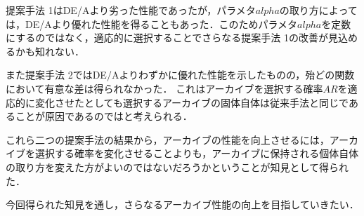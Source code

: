 \documentclass[a4paper,11pt,oneside,openany]{jsbook}
\begin{document}
提案手法 1はDE/Aより劣った性能であったが，パラメタ$alpha$の取り方によっては，DE/Aより優れた性能を得ることもあった．このためパラメタ$alpha$を定数にするのではなく，適応的に選択することでさらなる提案手法 1の改善が見込めるかも知れない．

また提案手法 2ではDE/Aよりわずかに優れた性能を示したものの，殆どの関数において有意な差は得られなかった．
これはアーカイブを選択する確率$AR$を適応的に変化させたとしても選択するアーカイブの固体自体は従来手法と同じであることが原因であるのではと考えられる．

これら二つの提案手法の結果から，アーカイブの性能を向上させるには，アーカイブを選択する確率を変化させることよりも，アーカイブに保持される個体自体の取り方を変えた方がよいのではないだろうかということが知見として得られた．

今回得られた知見を通し，さらなるアーカイブ性能の向上を目指していきたい．
\end{document}
